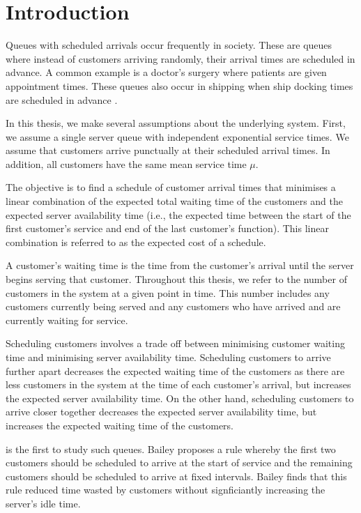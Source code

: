 \chapter{Introduction}
Queues with scheduled arrivals occur frequently in society. These are queues where instead of customers arriving randomly, their arrival times are scheduled in advance. A common example is a doctor's surgery where patients are given appointment times. These queues also occur in shipping when ship docking times are scheduled in advance \citep{Wang2}.

In this thesis, we make several assumptions about the underlying system. First, we assume a single server queue with independent exponential service times. We assume that customers arrive punctually at their scheduled arrival times. In addition, all customers have the same mean service time $\mu$.

The objective is to find a schedule of customer arrival times that minimises a linear combination of the expected total waiting time of the customers and the expected server availability time (i.e., the expected time between the start of the first customer's service and end of the last customer's function). This linear combination is referred to as the expected cost of a schedule.

A customer's waiting time is the time from the customer's arrival until the server begins serving that customer. Throughout this thesis, we refer to the number of customers in the system at a given point in time. This number includes any customers currently being served and any customers who have arrived and are currently waiting for service.

Scheduling customers involves a trade off between minimising customer waiting time and minimising server availability time. Scheduling customers to arrive further apart decreases the expected waiting time of the customers as there are less customers in the system at the time of each customer's arrival, but increases the expected server availability time. On the other hand, scheduling customers to arrive closer together decreases the expected server availability time, but increases the expected waiting time of the customers.

\citet{Bailey} is the first to study such queues. Bailey proposes a rule whereby the first two customers should be scheduled to arrive at the start of service and the remaining customers should be scheduled to arrive at fixed intervals. Bailey finds that this rule reduced time wasted by customers without signficiantly increasing the server's idle time.

